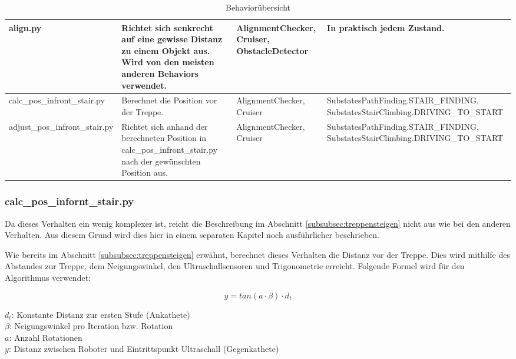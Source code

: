 \label{subsec:behavior-overview1}
\begin{center}
\begin{table}[H]
\begin{tabularx}{\textwidth}{|X|X|X|X|}
\hline
align.py & Richtet sich senkrecht auf eine gewisse Distanz zu einem Objekt aus. Wird von den meisten anderen Behaviors verwendet. & AlignmentChecker, Cruiser, ObstacleDetector & In praktisch jedem Zustand. \\
\hline
calc\_pos\_infront\_stair.py & Berechnet die Position vor der Treppe. & AlignmentChecker, Cruiser & SubstatesPathFinding.STAIR\_FINDING, SubstatesStairClimbing.DRIVING\_TO\_START \\
\hline
adjust\_pos\_infront\_stair.py & Richtet sich anhand der berechneten Position in calc\_pos\_infront\_stair.py nach der gewünschten Position aus. & AlignmentChecker, Cruiser & SubstatesPathFinding.STAIR\_FINDING, SubstatesStairClimbing.DRIVING\_TO\_START \\
\hline
\end{tabularx}
\caption[Behaviorübersicht]{Behaviorübersicht}
\label{tab:behaviorübersicht}
\end{table}
\end{center}

\newpage

\subsubsection{calc\_pos\_infornt\_stair.py}
Da dieses Verhalten ein wenig komplexer ist, reicht die Beschreibung im Abschnitt \ref{subsubsec:treppensteigen} nicht aus wie bei den anderen Verhalten. Aus diesem Grund wird dies hier in einem separaten Kapitel noch ausführlicher beschrieben.

Wie bereits im Abschnitt \ref{subsubsec:treppensteigen} erwähnt, berechnet dieses Verhalten die Distanz vor der Treppe. Dies wird mithilfe des Abstandes zur Treppe, dem Neigungswinkel, den Ultraschallsensoren und Trigonometrie erreicht. Folgende Formel wird für den Algorithmus verwendet:

\[ y = tan(a \cdot \beta) \cdot d_t \]

$d_t$: Konstante Distanz zur ersten Stufe (Ankathete) \\
$\beta$: Neigungswinkel pro Iteration bzw. Rotation \\
$a$: Anzahl Rotationen  \\
$y$: Distanz zwischen Roboter und Eintrittspunkt Ultraschall (Gegenkathete) \\

